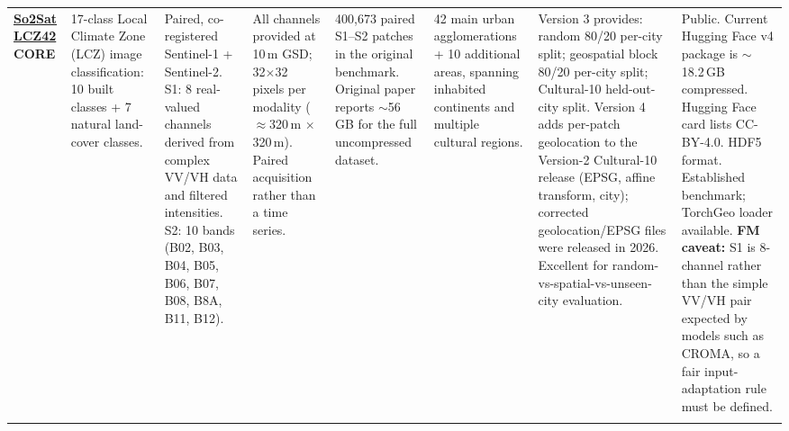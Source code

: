\documentclass[11pt,a4paper]{article}
\begin{document}
\begin{landscape}
\begin{longtable}{
    Q{1.8cm}
    Q{2.5cm}
    Q{3.0cm}
    Q{2.5cm}
    Q{2.1cm}
    Q{3.0cm}
    Q{3.4cm}
    Q{3.4cm}
}
\href{https://github.com/zhu-xlab/So2Sat-LCZ42}{\textbf{So2Sat LCZ42}}\newline
\textbf{CORE}
&
17-class Local Climate Zone (LCZ) image classification: 10 built classes + 7 natural land-cover classes.
&
Paired, co-registered Sentinel-1 + Sentinel-2. S1: 8 real-valued channels derived from complex VV/VH data and filtered intensities. S2: 10 bands (B02, B03, B04, B05, B06, B07, B08, B8A, B11, B12).
&
All channels provided at 10\,m GSD; 32$\times$32 pixels per modality ($\approx$320\,m $\times$ 320\,m). Paired acquisition rather than a time series.
&
400,673 paired S1--S2 patches in the original benchmark. Original paper reports $\sim$56\,GB for the full uncompressed dataset.
&
42 main urban agglomerations + 10 additional areas, spanning inhabited continents and multiple cultural regions.
&
Version 3 provides: random 80/20 per-city split; geospatial block 80/20 per-city split; Cultural-10 held-out-city split. Version 4 adds per-patch geolocation to the Version-2 Cultural-10 release (EPSG, affine transform, city); corrected geolocation/EPSG files were released in 2026. Excellent for random-vs-spatial-vs-unseen-city evaluation.
&
Public. Current Hugging Face v4 package is $\sim$18.2\,GB compressed. Hugging Face card lists CC-BY-4.0. HDF5 format. Established benchmark; TorchGeo loader available. \textbf{FM caveat:} S1 is 8-channel rather than the simple VV/VH pair expected by models such as CROMA, so a fair input-adaptation rule must be defined.
\\
\addlinespace


\end{longtable}
\end{landscape}
\end{document}
